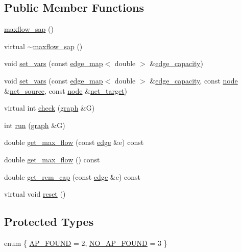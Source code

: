 \subsection*{Public Member Functions}
\begin{DoxyCompactItemize}
\item 
\mbox{\hyperlink{classmaxflow__sap_aa149130d8cf969f0b96aff72331bd48f}{maxflow\+\_\+sap}} ()
\item 
virtual \mbox{\hyperlink{classmaxflow__sap_ab49914afde43ffa0e5c3049cc063a8d2}{$\sim$maxflow\+\_\+sap}} ()
\item 
void \mbox{\hyperlink{classmaxflow__sap_ac50ba0330c169c7ce697947a76702e13}{set\+\_\+vars}} (const \mbox{\hyperlink{classedge__map}{edge\+\_\+map}}$<$ double $>$ \&\mbox{\hyperlink{classmaxflow__sap_acfa95eef5ea5bf7814c4dabd3994bc63}{edge\+\_\+capacity}})
\item 
void \mbox{\hyperlink{classmaxflow__sap_a936f6afa25de80046c7bd69dc47fdfa9}{set\+\_\+vars}} (const \mbox{\hyperlink{classedge__map}{edge\+\_\+map}}$<$ double $>$ \&\mbox{\hyperlink{classmaxflow__sap_acfa95eef5ea5bf7814c4dabd3994bc63}{edge\+\_\+capacity}}, const \mbox{\hyperlink{classnode}{node}} \&\mbox{\hyperlink{classmaxflow__sap_abd4266c76dbd73f7f719d3a4fba2655d}{net\+\_\+source}}, const \mbox{\hyperlink{classnode}{node}} \&\mbox{\hyperlink{classmaxflow__sap_a8d0e8f448ed29a1329a70c8f4f496c2c}{net\+\_\+target}})
\item 
virtual int \mbox{\hyperlink{classmaxflow__sap_aa2974bf25fb597677848fdb23c12d338}{check}} (\mbox{\hyperlink{classgraph}{graph}} \&G)
\item 
int \mbox{\hyperlink{classmaxflow__sap_ab4305a2bb370ad9c43cc68d339b2dda0}{run}} (\mbox{\hyperlink{classgraph}{graph}} \&G)
\item 
double \mbox{\hyperlink{classmaxflow__sap_ae90889b16323a2af0ab13e04c87953a5}{get\+\_\+max\+\_\+flow}} (const \mbox{\hyperlink{classedge}{edge}} \&e) const
\item 
double \mbox{\hyperlink{classmaxflow__sap_a81251d546cbdabc837f24fc3caf9fe0d}{get\+\_\+max\+\_\+flow}} () const
\item 
double \mbox{\hyperlink{classmaxflow__sap_a634835664542d5d181e1b63b99dda36c}{get\+\_\+rem\+\_\+cap}} (const \mbox{\hyperlink{classedge}{edge}} \&e) const
\item 
virtual void \mbox{\hyperlink{classmaxflow__sap_a14574d2f9ce31a3cdeb0888e57fc0616}{reset}} ()
\end{DoxyCompactItemize}
\subsection*{Protected Types}
\begin{DoxyCompactItemize}
\item 
enum \{ \mbox{\hyperlink{classmaxflow__sap_ac30ce6f46eb2dc97b557297c48989f8ea8438edbbdad4a54eea6615f442dcda37}{A\+P\+\_\+\+F\+O\+U\+ND}} = 2, 
\mbox{\hyperlink{classmaxflow__sap_ac30ce6f46eb2dc97b557297c48989f8ea73e7133865255ad10aebb463b1abb20f}{N\+O\+\_\+\+A\+P\+\_\+\+F\+O\+U\+ND}} = 3
 \}
\end{DoxyCompactItemize}
